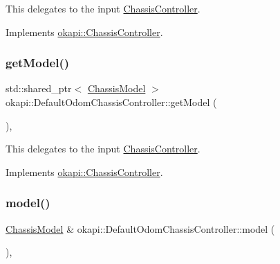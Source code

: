 This delegates to the input \mbox{\hyperlink{classokapi_1_1ChassisController}{Chassis\+Controller}}. 

Implements \mbox{\hyperlink{classokapi_1_1ChassisController_aa19351888b997d4a6596dac24520ebff}{okapi\+::\+Chassis\+Controller}}.

\mbox{\label{classokapi_1_1DefaultOdomChassisController_a83e8bf7115086c331ada990ceb872bf1}} 
\subsubsection{\texorpdfstring{getModel()}{getModel()}}
{\footnotesize\ttfamily std\+::shared\+\_\+ptr$<$ \mbox{\hyperlink{classokapi_1_1ChassisModel}{Chassis\+Model}} $>$ okapi\+::\+Default\+Odom\+Chassis\+Controller\+::get\+Model (\begin{DoxyParamCaption}{ }\end{DoxyParamCaption})\hspace{0.3cm}{\ttfamily [override]}, {\ttfamily [virtual]}}

This delegates to the input \mbox{\hyperlink{classokapi_1_1ChassisController}{Chassis\+Controller}}. 

Implements \mbox{\hyperlink{classokapi_1_1ChassisController_a1971d4b54b61718437824c026aca53c9}{okapi\+::\+Chassis\+Controller}}.

\mbox{\label{classokapi_1_1DefaultOdomChassisController_aa917086153b6298bf7792fd3b31ac240}} 
\subsubsection{\texorpdfstring{model()}{model()}}
{\footnotesize\ttfamily \mbox{\hyperlink{classokapi_1_1ChassisModel}{Chassis\+Model}} \& okapi\+::\+Default\+Odom\+Chassis\+Controller\+::model (\begin{DoxyParamCaption}{ }\end{DoxyParamCaption})\hspace{0.3cm}{\ttfamily [override]}, {\ttfamily [virtual]}}

